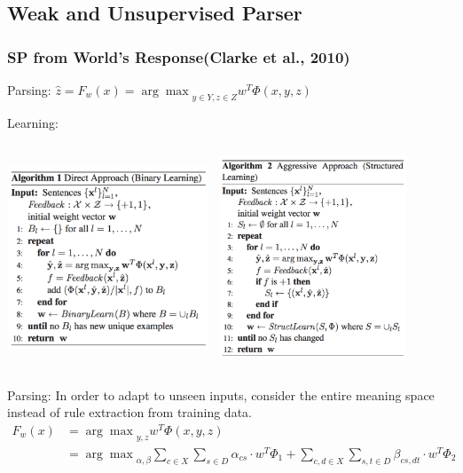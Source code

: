 \documentclass{beamer}
\begin{document}
\subsection{Weak and Unsupervised Parser}
\begin{frame}
    \frametitle{SP from World's Response(Clarke et al., 2010)}
     {
        Parsing: $ \hat z = F_w(x)={\arg\max}_{y\in Y,z\in Z}w^T\Phi(x,y,z) $

        Learning:
        \begin{columns}
            \includegraphics[width=6cm,height=6cm]{img/response-learning-direct.png}
            \includegraphics[width=6cm,height=6cm]{img/response-learning-aggressive.png}
        \end{columns}
    }
    
     {
        Parsing: In order to adapt to unseen inputs, consider the entire meaning space
        instead of rule extraction from training data.
        \begin{align*}
            F_w(x)
            &={\arg\max}_{y,z}w^T\Phi(x,y,z) \\
            &={\arg\max}_{\alpha,\beta}\sum_{c\in X}\sum_{s\in D}\alpha_{cs}\cdot w^T\Phi_1
            + \sum_{c,d\in X}\sum_{s,t\in D}\beta_{cs,dt}\cdot w^T\Phi_2
        \end{align*}
    }


\end{frame}
\end{document}
